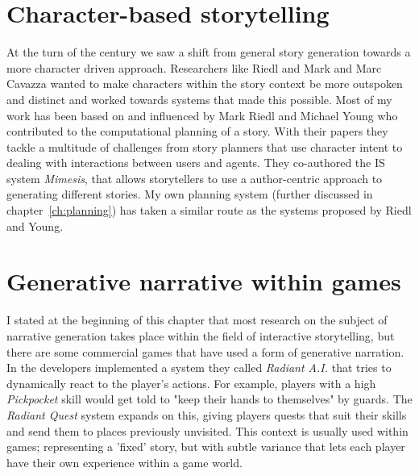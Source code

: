 \section{Character-based storytelling}
At the turn of the century we saw a shift from general story generation towards a more character driven approach.
Researchers like Riedl and Mark\cite{Riedl03character-focusednarrative}\cite{riedl2010narrative} and Marc Cavazza\cite{Cavazza:2002:CIS:630325.630747} wanted to make characters within the story context be more outspoken and distinct and worked towards systems that made this possible.
Most of my work has been based on and influenced by Mark Riedl and Michael Young who contributed to the computational planning of a story.
With their papers\cite{Riedl03character-focusednarrative}\cite{Riedl:2003:MIU:860575.860694}\citep{Riedl:2004:IPM:1018409.1018753} they tackle a multitude of challenges from story planners that use character intent to dealing with interactions between users and agents.
They co-authored the IS system \textit{Mimesis}\citep{young2003towards}, that allows storytellers to use a author-centric approach to generating different stories.
My own planning system (further discussed in chapter~\ref{ch:planning}) has taken a similar route as the systems proposed by Riedl and Young.

\section{Generative narrative within games}
I stated at the beginning of this chapter that most research on the subject of narrative generation takes place within the field of interactive storytelling, but there are some commercial games that have used a form of generative narration.
In  the developers implemented a system they called \textit{Radiant A.I.} that tries to dynamically react to the player's actions.
For example, players with a high \textit{Pickpocket} skill would get told to "keep their hands to themselves" by guards.
The \textit{Radiant Quest} system expands on this, giving players quests that suit their skills and send them to places previously unvisited.
This context is usually used within games; representing a 'fixed' story, but with subtle variance that lets each player have their own experience within a game world.


